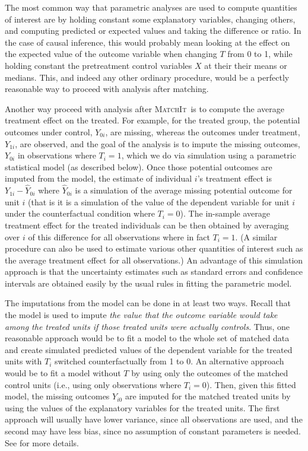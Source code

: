 \documentclass[oneside,letterpaper,titlepage]{article}
\newcommand{\MatchIt}{\textsc{MatchIt}}
\begin{document}

The most common way that parametric analyses are used to compute
quantities of interest are by holding constant some explanatory
variables, changing others, and computing predicted or expected values
and taking the difference or ratio.  In the case of causal inference,
this would probably mean looking at the effect on the expected value
of the outcome variable when changing $T$ from 0 to 1, while holding
constant the pretreatment control variables $X$ at their their means
or medians.  This, and indeed any other ordinary procedure, would be a
perfectly reasonable way to proceed with analysis after matching.

Another way proceed with analysis after \MatchIt\ is to compute the
average treatment effect on the treated.  For example, for the treated
group, the potential outcomes under control, $Y_{0i}$, are missing,
whereas the outcomes under treatment, $Y_{1i}$, are observed, and the
goal of the analysis is to impute the missing outcomes, $Y_{0i}$ in
observations where $T_i=1$, which we do via simulation using a
parametric statistical model (as described below).  Once those
potential outcomes are imputed from the model, the estimate of
individual $i$'s treatment effect is $Y_{1i}-\widehat{Y}_{0i}$ where
$\widehat{Y}_{0i}$ is a simulation of the average missing potential
outcome for unit $i$ (that is it is a simulation of the value of the
dependent variable for unit $i$ under the counterfactual condition
where $T_i=0$).  The in-sample average treatment effect for the
treated individuals can be then obtained by averaging over $i$ of this
difference for all observations where in fact $T_i=1$.  (A similar
procedure can also be used to estimate various other quantities of
interest such as the average treatment effect for all observations.)
An advantage of this simulation approach is that the uncertainty
estimates such as standard errors and confidence intervals are
obtained easily by the usual rules in fitting the parametric model.

The imputations from the model can be done in at least two ways.
Recall that the model is used to impute \emph{the value that the
  outcome variable would take among the treated units if those treated
  units were actually controls}.  Thus, one reasonable approach would
be to fit a model to the whole set of matched data and create
simulated predicted values of the dependent variable for the treated
units with $T_i$ switched counterfactually from 1 to 0.  An
alternative approach would be to fit a model without $T$ by using only
the outcomes of the matched control units (i.e., using only
observations where $T_i=0$).  Then, given this fitted model, the
missing outcomes $Y_{i0}$ are imputed for the matched treated units by
using the values of the explanatory variables for the treated units.
The first approach will usually have lower variance, since all
observations are used, and the second may have less bias, since no
assumption of constant parameters is needed.  See \citep{HoImaKin05}
for more details.
\end{document}

